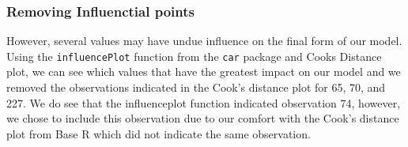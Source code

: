 \documentclass[]{elsarticle} %
\begin{document}
\subsubsection{Removing Influenctial
points}\label{removing-influenctial-points}

However, several values may have undue influence on the final form of
our model. Using the \texttt{influencePlot} function from the
\texttt{car} package and Cooks Distance plot, we can see which values
that have the greatest impact on our model and we removed the
observations indicated in the Cook's distance plot for 65, 70, and 227.
We do see that the influenceplot function indicated observation 74,
however, we chose to include this observation due to our comfort with
the Cook's distance plot from Base R which did not indicate the same
observation.
\end{document}
